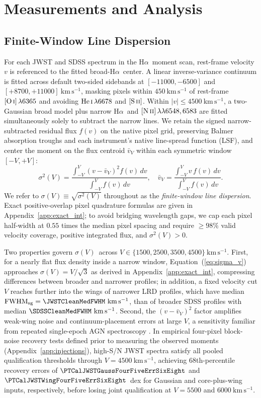 \documentclass[twocolumn]{aastex631}
\newcommand{\Ha}{\ensuremath{\mathrm{H}\alpha}}
\newcommand{\NII}{\ensuremath{[\mathrm{N\,\textsc{ii}}]}}
\newcommand{\SII}{\ensuremath{[\mathrm{S\,\textsc{ii}}]}}
\newcommand{\OI}{\ensuremath{[\mathrm{O\,\textsc{i}}]}}
\newcommand{\HeI}{\ensuremath{\mathrm{He\,\textsc{i}}}}
\newcommand{\kms}{\ensuremath{\mathrm{km\,s^{-1}}}}
\newcommand{\FWHMsg}{\ensuremath{\mathrm{FWHM}_{\mathrm{sg}}}}
\newcommand{\sigV}{\ensuremath{\sigma(V)}}
\begin{document}
\section{Measurements and Analysis}
\label{sec:methods}

\subsection{Finite-Window Line Dispersion}
\label{sec:methods_moments}

For each JWST and SDSS spectrum in the \Ha\ moment scan, rest-frame velocity $v$ is referenced to the fitted broad-\Ha\ center. A linear inverse-variance continuum is fitted across default two-sided sidebands at $[-11000, -6500]$ and $[+8700, +11000]~\kms$, masking pixels within $450~\kms$ of rest-frame $\OI\,\lambda 6365$ and avoiding $\HeI\,\lambda 6678$ and \SII. Within $|v| \le 4500~\kms$, a two-Gaussian broad model plus narrow \Ha\ and $\NII\,\lambda\lambda 6548,6583$ are fitted simultaneously solely to subtract the narrow lines. We retain the signed narrow-subtracted residual flux $f(v)$ on the native pixel grid, preserving Balmer absorption troughs and each instrument's native line-spread function (LSF), and center the moment on the flux centroid $\bar{v}_V$ within each symmetric window $[-V, +V]$:
\begin{equation}
\sigma^2(V) = \frac{\int_{-V}^{V} (v - \bar{v}_V)^2 f(v)\,dv}{\int_{-V}^{V} f(v)\,dv},
\quad
\bar{v}_V = \frac{\int_{-V}^{V} v\, f(v)\,dv}{\int_{-V}^{V} f(v)\,dv}.
\label{eq:sigma_v}
\end{equation}
We refer to $\sigV \equiv \sqrt{\sigma^2(V)}$ throughout as the \emph{finite-window line dispersion}. Exact positive-overlap pixel quadrature formulas are given in Appendix~\ref{app:exact_int}; to avoid bridging wavelength gaps, we cap each pixel half-width at $0.55$ times the median pixel spacing and require $\ge 98\%$ valid velocity coverage, positive integrated flux, and $\sigma^2(V) > 0$.

Two properties govern \sigV\ across $V \in \{1500, 2500, 3500, 4500\}~\kms$. First, for a nearly flat flux density inside a narrow window, Equation~(\ref{eq:sigma_v}) approaches $\sigV = V/\sqrt{3}$ as derived in Appendix~\ref{app:exact_int}, compressing differences between broader and narrower profiles; in addition, a fixed velocity cut $V$ reaches further into the wings of narrower LRD profiles, which have median $\FWHMsg = \JWSTCleanMedFWHM~\kms$, than of broader SDSS profiles with median $\SDSSCleanMedFWHM~\kms$. Second, the $(v - \bar{v}_V)^2$ factor amplifies weak-wing noise and continuum-placement errors at large $V$, a sensitivity familiar from repeated single-epoch AGN spectroscopy \citep{Denney2009}. In empirical four-pixel block-noise recovery tests defined prior to measuring the observed moments (Appendix~\ref{app:injections}), high-S/N JWST spectra satisfy all pooled qualification thresholds through $V = 4500~\kms$, achieving 68th-percentile recovery errors of $\PTCalJWSTGaussFourFiveErrSixEight$ and $\PTCalJWSTWingFourFiveErrSixEight$~dex for Gaussian and core-plus-wing inputs, respectively, before losing joint qualification at $V = 5500$ and $6000~\kms$.
\end{document}
